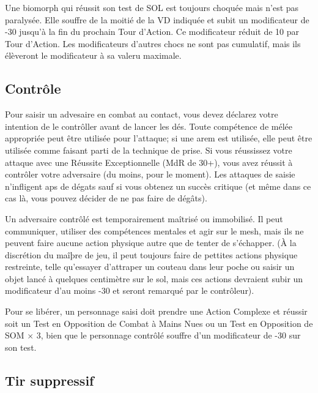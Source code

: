 Une biomorph qui réussit son test de SOL est toujours choquée mais n'est pas paralysée. Elle souffre de la moitié de la VD indiquée et subit un modificateur de -30 jusqu'à la fin du prochain Tour d'Action. Ce modificateur réduit de 10 par Tour d'Action. Les modificateurs d'autres chocs ne sont pas cumulatif, mais ils élèveront le modificateur à sa valeru maximale. 



\subsection{Contrôle} \label{sec:subdual} 

Pour saisir un advesaire en combat au contact, vous devez déclarez votre intention de le contrôller avant de lancer les dés. Toute compétence de mélée appropriée peut être utilisée pour l'attaque; si une arem est utilisée, elle peut être utilisée comme faisant parti de la technique de prise. Si vous réussissez votre attaque avec une Réussite Exceptionnelle (MdR de 30+), vous avez réussit à contrôler votre adversaire (du moins, pour le moment). Les attaques de saisie n'infligent aps de dégats sauf si vous obtenez un succès critique (et même dans ce cas là, vous pouvez décider de ne pas faire de dégâts). 

Un adversaire contrôlé est temporairement maîtrisé ou immobilisé. Il peut communiquer, utiliser des compétences mentales et agir sur le mesh, mais ils ne peuvent faire aucune action physique autre que de tenter de s'échapper. (À la discrétion du maîþre de jeu, il peut toujours faire de pettites actions physique restreinte, telle qu'essayer d'attraper un couteau dans leur poche ou saisir un objet lancé à quelques centimètre sur le sol, mais ces actions devraient subir un modificateur d'au moins -30 et seront remarqué par le contrôleur). 

Pour se libérer, un personnage saisi doit prendre une Action Complexe et réussir soit un Test en Opposition de Combat à Mains Nues ou un Test en Opposition de SOM $\times$ 3, bien que le personnage contrôlé souffre d'un modificateur de -30 sur son test. 



\subsection{Tir suppressif} \label{sec:suppressive-fire} 

